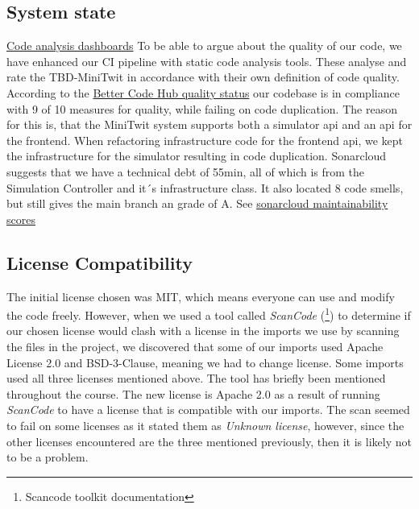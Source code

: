 \subsection{System state}
\label{subsec:system_state}
\hyperref[app:codeAnal]{Code analysis dashboards}
To be able to argue about the quality of our code, we have enhanced our CI pipeline with static code analysis tools. These analyse and rate the TBD-MiniTwit in accordance with their own definition of code quality. According to the \hyperref[fig:hubStatus]{Better Code Hub quality status} our codebase is in compliance with 9 of 10 measures for quality, while failing on code duplication. The reason for this is, that the MiniTwit system supports both a simulator api and an api for the frontend. When refactoring infrastructure code for the frontend api, we kept the infrastructure for the simulator resulting in code duplication.
Sonarcloud suggests that we have a technical debt of 55min, all of which is from the Simulation Controller and it´s infrastructure class. It also located 8 code smells, but still gives the main branch an grade of A. See \hyperref[fig:cloudMaintainability]{sonarcloud maintainability scores} 



\subsection{License Compatibility}
\label{subsec:license_compatability}
The initial license chosen was MIT, which means everyone can use and modify the code freely.
However, when we used a tool called \textit{ScanCode} (\footnote{Scancode toolkit documentation\cite{Scancode}}) to determine if our chosen license would clash with a license in the imports we use by scanning the files in the project, we discovered that some of our imports used Apache License 2.0 and BSD-3-Clause, meaning we had to change license. Some imports used all three licenses mentioned above. The tool has briefly been mentioned throughout the course.
The new license is Apache 2.0 as a result of running \textit{ScanCode} to have a license that is compatible with our imports. The scan seemed to fail on some licenses as it stated them as \textit{Unknown license}, however, since the other licenses encountered are the three mentioned previously, then it is likely not to be a problem.


